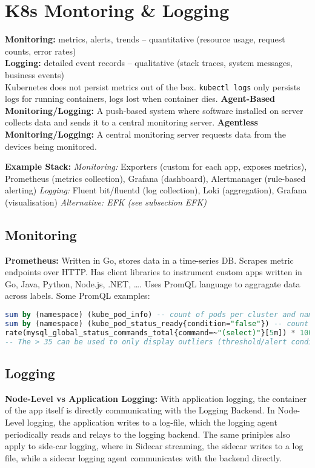 \section{K8s Montoring \& Logging}
\textbf{Monitoring:} metrics, alerts, trends – quantitative (resource usage, request counts, error rates)\\
\textbf{Logging:} detailed event records – qualitative (stack traces, system messages, business events) \\
Kubernetes does not persist metrics out of the box. \texttt{kubectl logs} only persists logs for running containers, logs lost when container dies.
\textbf{Agent-Based Monitoring/Logging:} A push-based system where software installed on server collects data and sends it to a central monitoring server. \textbf{Agentless Monitoring/Logging:} A central monitoring server requests data from the devices being monitored.

\begin{mdframed}
	\textbf{Example Stack:} \textit{Monitoring:} Exporters (custom for each app, exposes metrics), Prometheus (metrics collection), Grafana (dashboard), Alertmanager (rule-based alerting) \textit{Logging:} Fluent bit/fluentd (log collection), Loki (aggregation), Grafana (visualisation)
	\textit{Alternative: EFK (see subsection EFK)}
\end{mdframed}

\subsection{Monitoring}
\textbf{Prometheus:} Written in Go, stores data in a time-series DB. Scrapes metric endpoints over HTTP. Has client libraries to instrument custom apps written in Go, Java, Python, Node.js, .NET, \dots. Uses PromQL language to aggragate data across labels. Some PromQL examples:
\begin{lstlisting}[language=sql]
sum by (namespace) (kube_pod_info) -- count of pods per cluster and namespace
sum by (namespace) (kube_pod_status_ready{condition="false"}) -- count of pods not ready by namespace
rate(mysql_global_status_commands_total{command=~"(select)"}[5m]) * 100 > 35 -- Rate of MySQL SELECT commands over last 5 minutes
-- The > 35 can be used to only display outliers (threshold/alert conditions)
\end{lstlisting}

\subsection{Logging}
\textbf{Node-Level vs Application Logging:} With application logging, the container of the app itself is directly communicating with the Logging Backend. In Node-Level logging, the application writes to a log-file, which the logging agent periodically reads and relays to the logging backend. The same priniples also apply to side-car logging, where in Sidecar streaming, the sidecar writes to a log file, while a sidecar logging agent communicates with the backend directly.

